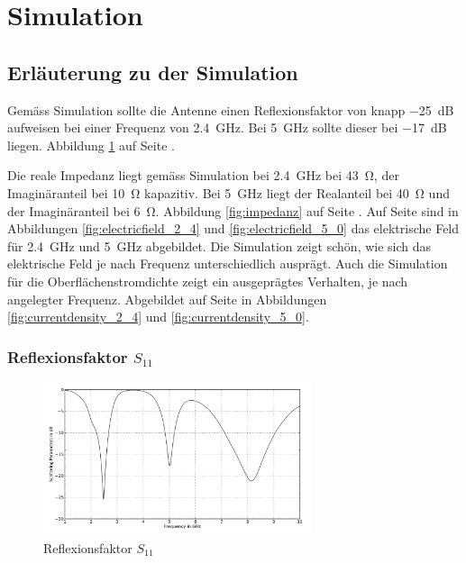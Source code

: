 \section{Simulation}

\subsection{Erläuterung zu der Simulation}
Gemäss Simulation sollte die Antenne einen Reflexionsfaktor von knapp
\SI{-25}{\dB} aufweisen bei einer Frequenz von \SI{2.4}{\giga\hertz}.
Bei \SI{5}{\giga\hertz} sollte dieser bei \SI{-17}{\dB} liegen. Abbildung
\ref{fig:reflexionsfaktor} auf Seite \pageref{fig:reflexionsfaktor}.

Die reale Impedanz liegt gemäss Simulation bei \SI{2.4}{\giga\hertz} bei
\SI{43}{\ohm}, der Imaginäranteil bei \SI{10}{\ohm} kapazitiv. Bei
\SI{5}{\giga\hertz} liegt der Realanteil bei \SI{40}{\ohm} und der
Imaginäranteil bei \SI{6}{\ohm}. Abbildung \ref{fig:impedanz} auf
Seite \pageref{fig:impedanz}. Auf Seite \pageref{fig:electricfield}
sind in Abbildungen \ref{fig:electricfield_2_4} und \ref{fig:electricfield_5_0}
das elektrische Feld für \SI{2.4}{\giga\hertz} und \SI{5}{\giga\hertz}
abgebildet. Die Simulation zeigt schön, wie sich das elektrische Feld
je nach Frequenz unterschiedlich ausprägt. Auch die Simulation für die
Oberflächenstromdichte zeigt ein ausgeprägtes Verhalten, je nach
angelegter Frequenz. Abgebildet auf Seite \pageref{fig:currentdensity}
in Abbildungen \ref{fig:currentdensity_2_4} und \ref{fig:currentdensity_5_0}.


\clearpage
\subsubsection{Reflexionsfaktor $S_{11}$}
\begin{figure}[h!]
	\centering
	\includegraphics[width=0.7\textwidth]{../fig/plt/crazy_stuff_l4_pcb_v2c_laptop_1a_105_S11_2.png}
	\caption{Reflexionsfaktor $S_{11}$}
	\label{fig:reflexionsfaktor}
\end{figure}

